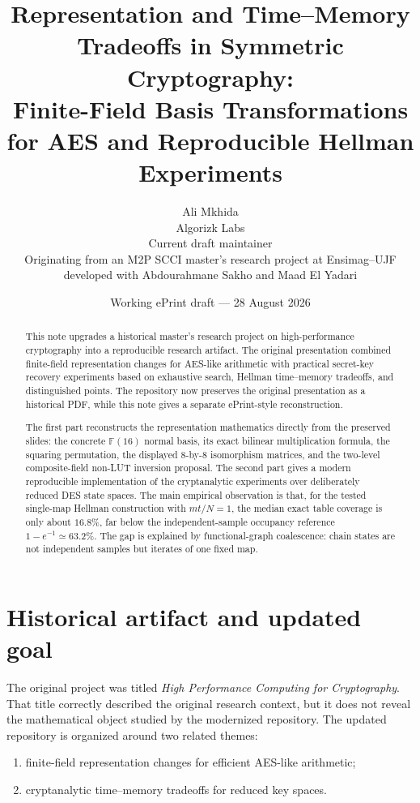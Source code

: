 \documentclass[11pt]{article}
\title{Representation and Time--Memory Tradeoffs in Symmetric Cryptography:\\
Finite-Field Basis Transformations for AES and Reproducible Hellman Experiments}
\author{Ali Mkhida\\Algorizk Labs\\[2pt]\small Current draft maintainer\\\small Originating from an M2P SCCI master's research project at Ensimag--UJF\\\small developed with Abdourahmane Sakho and Maad El Yadari}
\date{Working ePrint draft --- 28 August 2026}
\newcommand{\GF}{\mathbb{F}}
\begin{document}
\maketitle

\begin{abstract}
This note upgrades a historical master's research project on high-performance
cryptography into a reproducible research artifact.  The original presentation
combined finite-field representation changes for AES-like arithmetic with
practical secret-key recovery experiments based on exhaustive search, Hellman
time--memory tradeoffs, and distinguished points.  The repository now preserves
the original presentation as a historical PDF, while this note gives a separate
ePrint-style reconstruction.

The first part reconstructs the representation mathematics directly from the
preserved slides: the concrete $\GF(16)$ normal basis, its exact bilinear
multiplication formula, the squaring permutation, the displayed 8-by-8
isomorphism matrices, and the two-level composite-field non-LUT inversion
proposal.  The second part gives a modern reproducible
implementation of the cryptanalytic experiments over deliberately reduced DES
state spaces.  The main empirical observation is that, for the tested
single-map Hellman construction with $mt/N=1$, the median exact table coverage
is only about $16.8\%$, far below the independent-sample occupancy reference
$1-e^{-1}\simeq 63.2\%$.  The gap is explained by functional-graph coalescence:
chain states are not independent samples but iterates of one fixed map.
\end{abstract}

\section{Historical artifact and updated goal}

The original project was titled \emph{High Performance Computing for
Cryptography}.  That title correctly described the original research context, but it does
not reveal the mathematical object studied by the modernized repository.  The
updated repository is organized around two related themes:

\begin{enumerate}
  \item finite-field representation changes for efficient AES-like arithmetic;
  \item cryptanalytic time--memory tradeoffs for reduced key spaces.
\end{enumerate}
\end{document}
